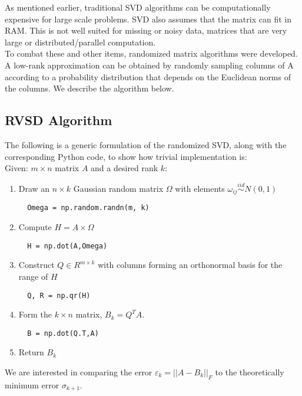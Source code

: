 \documentclass{article}
\begin{document}
As mentioned earlier, traditional SVD algorithms can be computationally expensive for large scale problems. SVD also assumes that the matrix can fit in RAM. This is not well suited for missing or noisy data, matrices that are very large or distributed/parallel computation.
\\

To combat these and other items, randomized matrix algorithms were developed. A low-rank approximation can be obtained by randomly sampling columns of A according to a probability distribution that depends on the Euclidean norms of the columns. We describe the algorithm below.

\subsection{RVSD Algorithm}

The following is a generic formulation of the randomized SVD, along with the corresponding Python code, to show how trivial implementation is:
\\

Given: $m \times n$ matrix $A$ and a desired rank $k$:

\begin{enumerate}
\item Draw an $n \times k$ Gaussian random matrix $\Omega$ with elements $\omega_{ij} \stackrel{iid}{\sim} N(0,1)$
\begin{verbatim}
  Omega = np.random.randn(m, k)
\end{verbatim}
\item Compute $H = A \times \Omega$
\begin{verbatim}
  H = np.dot(A,Omega)
\end{verbatim}
\item Construct $Q \in R^{m \times k}$ with columns forming an orthonormal basis for the range of $H$
\begin{verbatim}
  Q, R = np.qr(H)
\end{verbatim}
\item Form the $k \times n$ matrix, $B_{k} = Q^{T}A$.
\begin{verbatim}
  B = np.dot(Q.T,A)
\end{verbatim}
\item Return $B_{k}$
\end{enumerate}

We are interested in comparing the error $\varepsilon_{k} = ||A - B_{k}||_{F}$ to the theoretically minimum error $\sigma_{k+1}$.
\end{document}
